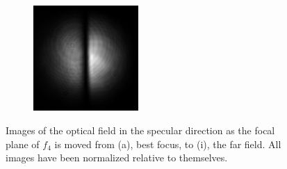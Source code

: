 \begin{figure}[ht]
\begin{subfigure}[b]{4cm}
\includegraphics[width=4cm,keepaspectratio]{interference/figures/move/123-1.png}
\caption{}
\end{subfigure}
\caption{Images of the optical field in the specular direction as the focal
plane of $f_4$ is moved from (a), best focus, to (i), the far field.  All
images have been normalized relative to themselves.}
\label{fig:123up}
\end{figure}


